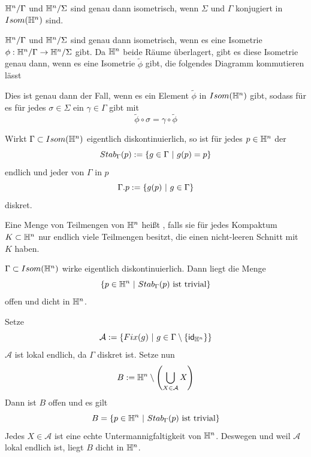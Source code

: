 \documentclass{book}
\begin{document}
\Prop{}
$\mathbb{H}^n / \Gamma$ und $\mathbb{H}^n / \Sigma$ sind genau dann isometrisch, wenn $\Sigma$ und $\Gamma$ konjugiert in $Isom(\mathbb{H}^n)$ sind.
\begin{Beweis}{}
	$\mathbb{H}^n / \Gamma$ und $\mathbb{H}^n / \Sigma$ sind genau dann isometrisch, wenn es eine Isometrie $\phi : \mathbb{H}^n / \Gamma\overset{}{\rightarrow}\mathbb{H}^n / \Sigma$ gibt. Da $\mathbb{H}^n$ beide Räume überlagert, gibt es diese Isometrie genau dann, wenn es eine Isometrie $\widetilde{\phi}$ gibt, die folgendes Diagramm kommutieren lässt
	\begin{center}
	\end{center}
Dies ist genau dann der Fall, wenn es ein Element $\widetilde{\phi}$ in $Isom(\mathbb{H}^n)$ gibt, sodass für es für jedes $\sigma \in \Sigma$ ein $\gamma \in \Gamma$ gibt mit
\[ \widetilde{\phi}  \circ \sigma = \gamma \circ \widetilde{\phi} \]
\end{Beweis}

\Bem{}
Wirkt $\Gamma \subset Isom(\mathbb{H}^n)$ eigentlich diskontinuierlich, so ist für jedes $p\in \mathbb{H}^n$ der 
\[ Stab_\Gamma(p) := \set{g \in \Gamma}{g(p) = p} \]
endlich und jeder  von $\Gamma$ in $p$
\[ \Gamma.p := \set{g(p)}{g\in \Gamma} \]
diskret.

\Def{}
Eine Menge von Teilmengen von $\mathbb{H}^n$ heißt , falls sie für jedes Kompaktum $K \subset \mathbb{H}^n$ nur endlich viele Teilmengen besitzt, die einen nicht-leeren Schnitt mit $K$ haben.

\Prop{}
$\Gamma\subset Isom(\mathbb{H}^n)$ wirke eigentlich diskontinuierlich. Dann liegt die Menge
\[ \set{p \in \H^n}{ Stab_\Gamma(p) \text{ ist trivial} } \]
offen und dicht in $\mathbb{H}^n$.
\begin{Beweis}{}
	Setze
	\[ \mathcal{A}:= \set{Fix(g)}{g \in \Gamma \setminus \{\id{\H^n}\}} \]
	$\mathcal{A}$ ist lokal endlich, da $\Gamma$ diskret ist. Setze nun
	\[ B:= \mathbb{H}^n\setminus \left(\bigcup_{X \in \mathcal{A}} X\right) \]
	Dann ist $B$ offen und es gilt
	\[ B = \set{p \in \H^n}{ Stab_\Gamma(p) \text{ ist trivial} } \]
	Jedes $X \in \mathcal{A}$ ist eine echte Untermannigfaltigkeit von $\mathbb{H}^n$. Deswegen und weil $\mathcal{A}$ lokal endlich ist, liegt $B$ dicht in $\mathbb{H}^n$.
\end{Beweis}
\end{document}
